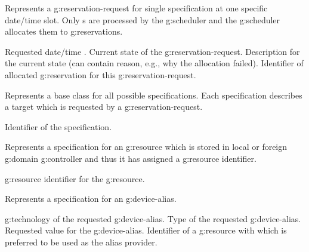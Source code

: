 \begin{Api}
Represents a \gls{g:reservation-request} for single specification at one specific date/time slot.
Only s are processed by the \gls{g:scheduler} and the \gls{g:scheduler} allocates them to \glspl{g:reservation}. 
\begin{ApiClassAttributes}
 Requested date/time .
 Current state of the \gls{g:reservation-request}.
 Description for the current state (can contain reason, e.g., why the allocation failed).
 Identifier of allocated \gls{g:reservation} for this \gls{g:reservation-request}.
\end{ApiClassAttributes}

Represents a base class for all possible specifications. Each specification describes a target which is requested by a \gls{g:reservation-request}.
\begin{ApiClassAttributes}
 Identifier of the specification.
\end{ApiClassAttributes}

Represents a specification for an \gls{g:resource} which is stored in local or foreign \gls{g:domain} \gls{g:controller} and thus it has assigned a \gls{g:resource} identifier.
\begin{ApiClassAttributes}
 \Gls{g:resource} identifier for the \gls{g:resource}.
\end{ApiClassAttributes}

Represents a specification for an \gls{g:device-alias}.
\begin{ApiClassAttributes}
 \Gls{g:technology} of the requested \gls{g:device-alias}.
 Type of the requested \gls{g:device-alias}.
 Requested value for the \gls{g:device-alias}.
 Identifier of a \gls{g:resource} with  which is preferred to be used as the alias provider.
\end{ApiClassAttributes}


\end{Api}
